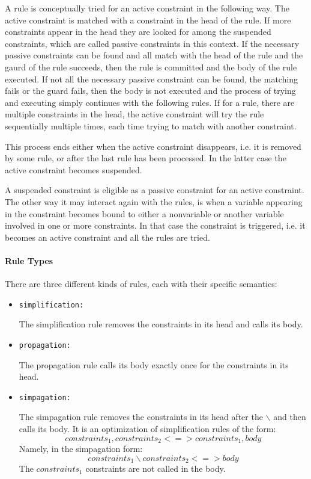 A rule is conceptually tried for an active constraint in the following
way. The active constraint is matched with a constraint in the head of the
rule. If more constraints appear in the head they are looked for among the
suspended constraints, which are called passive constraints in this context. If
the necessary passive constraints can be found and all match with the head of
the rule and the gaurd of the rule succeeds, then the rule is committed and
the body of the rule executed.  If not all the necessary passive constraint
can be found, the matching fails or the guard fails, then the body is not
executed and the process of trying and executing simply continues with 
the following rules. If for
a rule, there are multiple constraints in the head, the active constraint
will try the rule sequentially multiple times, each time trying to match with
another constraint.

This process ends either when the active constraint disappears, i.e. it is
removed by some rule, or after the last rule has been processed. In the latter
case the active constraint becomes suspended.

A suspended constraint is eligible as a passive constraint for an active
constraint. The other way it may interact again with the rules, is when
a variable appearing in the constraint becomes bound to either a nonvariable
or another variable involved in one or more constraints. In that case the
constraint is triggered, i.e. it becomes an active constraint and all the rules
are tried.

\paragraph{Rule Types}
There are three different kinds of rules, each with their specific semantics:
\begin{itemize}
\item \texttt{simplification:}

The simplification rule removes the constraints in its head and calls its body.

\item \texttt{propagation:}

The propagation rule calls its body exactly once for the constraints in its head.

\item \texttt{simpagation:}

The simpagation rule removes the constraints in its head after the $\backslash$ and then calls its body.
It is an optimization of simplification rules of the form:
\[constraints_1, constraints_2 <=> constraints_1, body \]
Namely, in the simpagation form:
\[ constraints_1 \backslash constraints_2 <=> body \]
The $constraints_1$ constraints are not called in the body.

\end{itemize}

